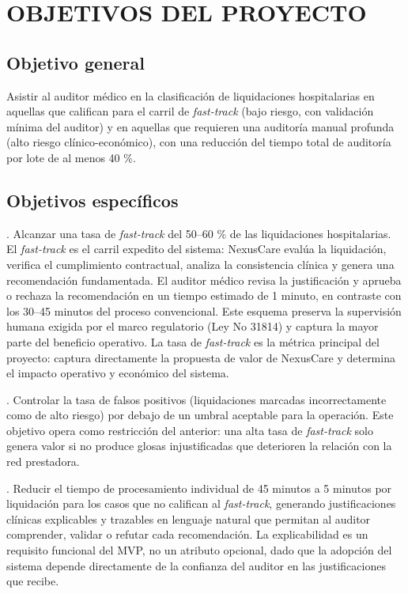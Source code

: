 
\chapter{OBJETIVOS DEL PROYECTO}
\section{Objetivo general}

Asistir al auditor médico en la clasificación de liquidaciones hospitalarias en aquellas que califican para el carril de \textit{fast-track} (bajo riesgo, con validación mínima del auditor) y en aquellas que requieren una auditoría manual profunda (alto riesgo clínico-económico), con una reducción del tiempo total de auditoría por lote de al menos 40 \%.

\section{Objetivos específicos}

. Alcanzar una tasa de \textit{fast-track} del 50–60 \% de las liquidaciones hospitalarias. El \textit{fast-track} es el carril expedito del sistema: NexusCare evalúa la liquidación, verifica el cumplimiento contractual, analiza la consistencia clínica y genera una recomendación fundamentada. El auditor médico revisa la justificación y aprueba o rechaza la recomendación en un tiempo estimado de 1 minuto, en contraste con los 30–45 minutos del proceso convencional. Este esquema preserva la supervisión humana exigida por el marco regulatorio (Ley No 31814) y captura la mayor parte del beneficio operativo. La tasa de \textit{fast-track} es la métrica principal del proyecto: captura directamente la propuesta de valor de NexusCare y determina el impacto operativo y económico del sistema.

. Controlar la tasa de falsos positivos (liquidaciones marcadas incorrectamente como de alto riesgo) por debajo de un umbral aceptable para la operación. Este objetivo opera como restricción del anterior: una alta tasa de \textit{fast-track} solo genera valor si no produce glosas injustificadas que deterioren la relación con la red prestadora.

. Reducir el tiempo de procesamiento individual de 45 minutos a 5 minutos por liquidación para los casos que no califican al \textit{fast-track}, generando justificaciones clínicas explicables y trazables en lenguaje natural que permitan al auditor comprender, validar o refutar cada recomendación. La explicabilidad es un requisito funcional del MVP, no un atributo opcional, dado que la adopción del sistema depende directamente de la confianza del auditor en las justificaciones que recibe.

